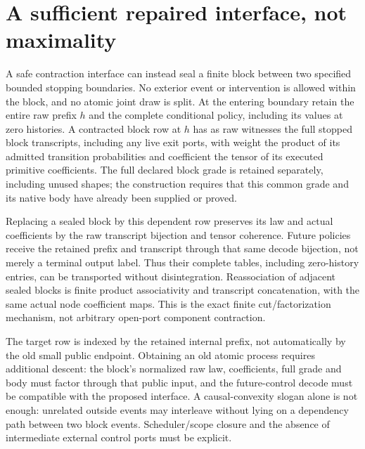 \documentclass{article}
\begin{document}
\section{A sufficient repaired interface, not maximality}
A safe contraction interface can instead seal a finite block between two
specified bounded stopping boundaries. No exterior event or intervention is
allowed within the block, and no atomic joint draw is split. At the entering
boundary retain the entire raw prefix $h$ and the complete conditional policy,
including its values at zero histories. A contracted block row at $h$ has
as raw witnesses the full stopped block transcripts, including any live exit
ports, with weight the
product of its admitted transition probabilities and coefficient the tensor
of its executed primitive coefficients. The full declared block grade is
retained separately, including unused shapes; the construction requires that
this common grade and its native body have already been supplied or proved.

Replacing a sealed block by this dependent row preserves its law and actual
coefficients by the raw transcript bijection and tensor coherence. Future
policies receive the retained prefix and transcript through that same decode
bijection, not merely a terminal output label. Thus their complete tables,
including zero-history entries, can be transported without disintegration.
Reassociation of adjacent sealed blocks is finite product associativity and
transcript concatenation, with the same actual node coefficient maps.
This is the exact finite cut/factorization mechanism, not arbitrary open-port
component contraction.

The target row is indexed by the retained internal prefix, not automatically
by the old small public endpoint. Obtaining an old atomic process requires
additional descent: the block's normalized raw law, coefficients, full grade
and body must factor through that public input, and the future-control decode
must be compatible with the proposed interface. A causal-convexity slogan
alone is not enough: unrelated outside events may interleave without lying
on a dependency path between two block events. Scheduler/scope closure and
the absence of intermediate external control ports must be explicit.
\end{document}
